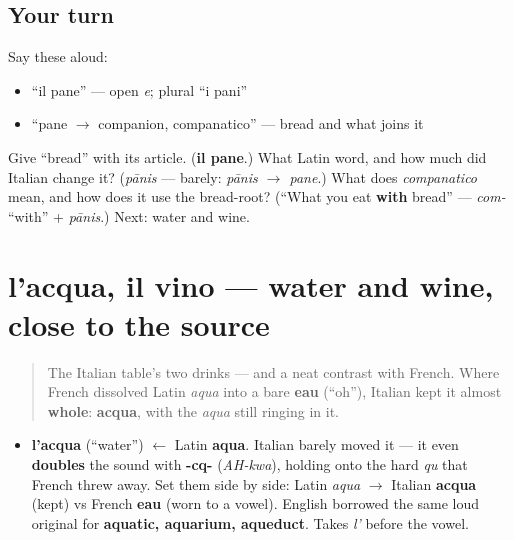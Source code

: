 \subsection*{Your turn}
Say these aloud:

\begin{itemize}
\raggedright
  \item \textquotedblleft{}il pane\textquotedblright{} — open \emph{e}; plural \textquotedblleft{}i pani\textquotedblright{}
  \item \textquotedblleft{}pane $\to$ companion, companatico\textquotedblright{} — bread and what joins it
\end{itemize}

\begin{tcolorbox}[breakable,colback=teal!4,colframe=teal!35!black,title={Before you move on}]
Give \textquotedblleft{}bread\textquotedblright{} with its article. (\textbf{il pane}.) What Latin word, and how much did Italian change it? (\emph{pānis} — barely: \emph{pānis $\to$ pane}.) What does \emph{companatico} mean, and how does it use the bread-root? (\textquotedblleft{}What you eat \textbf{with} bread\textquotedblright{} — \emph{com-} \textquotedblleft{}with\textquotedblright{} + \emph{pānis}.) Next: water and wine.
\end{tcolorbox}
\section[l'acqua, il vino]{l'acqua, il vino — water and wine, close to the source}

\label{lesson:IT-C11-acqua-vino}



\begin{quote}
The Italian table's two drinks — and a neat contrast with French. Where French dissolved Latin \emph{aqua} into a bare \textbf{eau} (\textquotedblleft{}oh\textquotedblright{}), Italian kept it almost \textbf{whole}: \textbf{acqua}, with the \emph{aqua} still ringing in it.
\end{quote}

\begin{cousinweb}
\begin{itemize}
\raggedright
  \item \textbf{l'acqua} (\textquotedblleft{}water\textquotedblright{}) $\leftarrow$ Latin \textbf{aqua}. Italian barely moved it — it even \textbf{doubles} the sound with \textbf{-cq-} (\emph{AH-kwa}), holding onto the hard \emph{qu} that French threw away. Set them side by side: Latin \emph{aqua} $\to$ Italian \textbf{acqua} (kept) vs French \textbf{eau} (worn to a vowel). English borrowed the same loud original for \textbf{aquatic, aquarium, aqueduct}. Takes \emph{l'} before the vowel.
\end{itemize}
\end{cousinweb}

